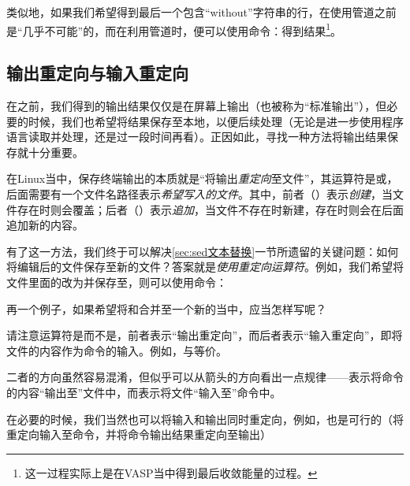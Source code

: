 类似地，如果我们希望得到最后一个包含“without”字符串的行，在使用管道之前是“几乎不可能”的，而在利用管道时，便可以使用命令：得到结果\footnote{这一过程实际上是在VASP当中得到最后收敛能量的过程。}。

\subsection{输出重定向与输入重定向}\label{subsec:管道与重定向-输出重定向与输入重定向}

在之前，我们得到的输出结果仅仅是在屏幕上输出（也被称为“标准输出”），但必要的时候，我们也希望将结果保存至本地，以便后续处理（无论是进一步使用程序语言读取并处理，还是过一段时间再看）。正因如此，寻找一种方法将输出结果保存就十分重要。

在Linux当中，保存终端输出的本质就是“将输出\emph{重定向}至文件”，其运算符是\code{>}或\code{>>}，后面需要有一个文件名路径表示\emph{希望写入的文件}。其中，前者（\code{>}）表示\emph{创建}，当文件存在时则会覆盖；后者（\code{>>}）表示\emph{追加}，当文件不存在时新建，存在时则会在后面追加新的内容。

有了这一方法，我们终于可以解决\ref{sec:sed文本替换}一节所遗留的关键问题：如何将编辑后的文件保存至新的文件？答案就是\emph{使用重定向运算符}。例如，我们希望将文件里面的改为并保存至，则可以使用命令：

再一个例子，如果希望将和合并至一个新的当中，应当怎样写呢？


\begin{extend}
    请注意运算符是\code{>}而不是\code{<}，前者表示“输出重定向”，而后者表示“输入重定向”，即将文件的内容作为命令的输入。例如，与等价。

    二者的方向虽然容易混淆，但似乎可以从箭头的方向看出一点规律——\code{>}表示将命令的内容“输出至”文件中，而\code{<}表示将文件“输入至”命令中。
\end{extend}

在必要的时候，我们当然也可以将输入和输出同时重定向，例如，也是可行的（将重定向输入至命令，并将命令输出结果重定向至输出）

